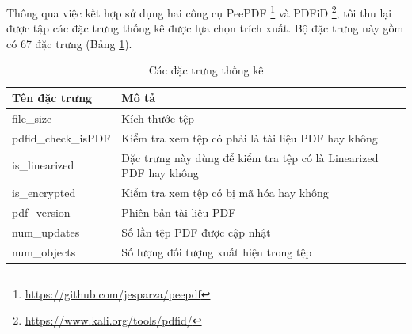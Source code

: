 \documentclass[./../main.tex]{subfiles}
\begin{document}
Thông qua việc kết hợp sử dụng hai công cụ PeePDF \footnote{\url{https://github.com/jesparza/peepdf}} và PDFiD \footnote{\url{https://www.kali.org/tools/pdfid/}}, tôi thu lại được tập các đặc trưng thống kê được lựa chọn trích xuất. Bộ đặc trưng này gồm có 67 đặc trưng (Bảng \ref{tab:danh_sach_bang_67_dac_trung}).

\begin{longtable}[c]{|p{}|p{}|}
	\caption{Các đặc trưng thống kê}
	\label{tab:danh_sach_bang_67_dac_trung}                                                                                                                                 \\
	\hline
	\textbf{Tên đặc trưng}                    & \textbf{Mô tả}                                                                                                              \\ \hline
	\endfirsthead
	\endhead
	file\_size                                & Kích thước tệp                                                                                                              \\ \hline
	pdfid\_check\_isPDF                       & Kiểm tra xem tệp có phải là tài liệu PDF hay không                                                                          \\ \hline
	is\_linearized                            & Đặc trưng này dùng để kiểm tra tệp có là Linearized PDF hay không                                                           \\ \hline
	is\_encrypted                             & Kiểm tra xem tệp có bị mã hóa hay không                                                                                     \\ \hline
	pdf\_version                              & Phiên bản tài liệu PDF                                                                                                      \\ \hline
	num\_updates                              & Số lần tệp PDF được cập nhật                                                                                                \\ \hline
	num\_objects                              & Số lượng đối tượng xuất hiện trong tệp                                                                                      \\ \hline

\end{longtable}
\end{document}
